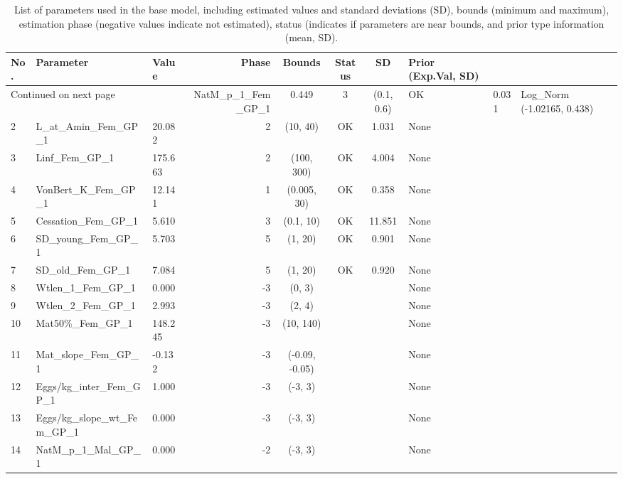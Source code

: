 \documentclass[12pt,]{article}
\begin{document}
\begin{landscape}
\begin{longtable}{lp{2.5in}lrcccl}
\caption{List of parameters used in
                                              the base model, including estimated 
                                              values and standard deviations (SD), 
                                              bounds (minimum and maximum), 
                                              estimation phase (negative values indicate
                                              not estimated), status (indicates if 
                                              parameters are near bounds, and prior type
                                              information (mean, SD).} \\ 
  \hline
No. & Parameter & Value & Phase & Bounds & Status & SD & Prior (Exp.Val, SD)  \\ 
  \hline 
\endhead 
\hline 
\multicolumn{3}{l}{\footnotesize Continued on next page} 
\endfoot 
\endlastfoot 
 \hline
1 & NatM\_p\_1\_Fem\_GP\_1 & 0.449 & 3 & (0.1, 0.6) & OK & 0.031 & Log\_Norm (-1.02165, 0.438) \\ 
  2 & L\_at\_Amin\_Fem\_GP\_1 & 20.082 & 2 & (10, 40) & OK & 1.031 & None \\ 
  3 & Linf\_Fem\_GP\_1 & 175.663 & 2 & (100, 300) & OK & 4.004 & None \\ 
  4 & VonBert\_K\_Fem\_GP\_1 & 12.141 & 1 & (0.005, 30) & OK & 0.358 & None \\ 
  5 & Cessation\_Fem\_GP\_1 & 5.610 & 3 & (0.1, 10) & OK & 11.851 & None \\ 
  6 & SD\_young\_Fem\_GP\_1 & 5.703 & 5 & (1, 20) & OK & 0.901 & None \\ 
  7 & SD\_old\_Fem\_GP\_1 & 7.084 & 5 & (1, 20) & OK & 0.920 & None \\ 
  8 & Wtlen\_1\_Fem\_GP\_1 & 0.000 & -3 & (0, 3) &  &  & None \\ 
  9 & Wtlen\_2\_Fem\_GP\_1 & 2.993 & -3 & (2, 4) &  &  & None \\ 
  10 & Mat50\%\_Fem\_GP\_1 & 148.245 & -3 & (10, 140) &  &  & None \\ 
  11 & Mat\_slope\_Fem\_GP\_1 & -0.132 & -3 & (-0.09, -0.05) &  &  & None \\ 
  12 & Eggs/kg\_inter\_Fem\_GP\_1 & 1.000 & -3 & (-3, 3) &  &  & None \\ 
  13 & Eggs/kg\_slope\_wt\_Fem\_GP\_1 & 0.000 & -3 & (-3, 3) &  &  & None \\ 
  14 & NatM\_p\_1\_Mal\_GP\_1 & 0.000 & -2 & (-3, 3) &  &  & None \\ 

\end{longtable}
\end{landscape}
\end{document}
